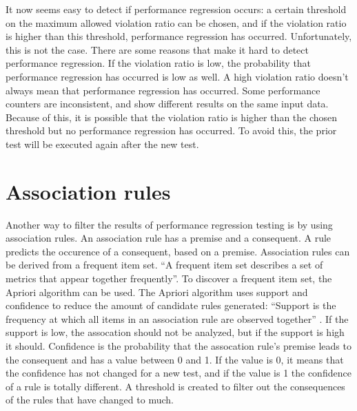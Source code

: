 It now seems easy to detect if performance regression occurs: a certain threshold on the maximum allowed violation ratio can be chosen, and if the violation ratio is higher than this threshold, performance regression has occurred. Unfortunately, this is not the case. There are some reasons that make it hard to detect performance regression. If the violation ratio is low, the probability that performance regression has occurred is low as well. A high violation ratio doesn't always mean that performance regression has occurred. Some performance counters are inconsistent, and show different results on the same input data. Because of this, it is possible that the violation ratio is higher than the chosen threshold but no performance regression has occurred. To avoid this, the prior test will be executed again after the new test.

\section{Association rules}
Another way to filter the results of performance regression testing is by using association rules. An association rule has a premise and a consequent. A rule predicts the occurence of a consequent, based on a premise. Association rules can be derived from a frequent item set. ``A frequent item set describes a set of metrics that appear together frequently''\cite{foo2010mining}. To discover a frequent item set, the Apriori algorithm can be used. The Apriori algorithm uses support and confidence to reduce the amount of candidate rules generated:
``Support is the frequency at which all items in an association rule are observed together'' \cite{foo2010mining}. If the support is low, the assocation should not be analyzed, but if the support is high it should. Confidence is the probability that the assocation rule's premise leads to the consequent and has a value between 0 and 1. If the value is 0, it means that the confidence has not changed for a new test, and if the value is 1 the confidence of a rule is totally different. A threshold is created to filter out the consequences of the rules that have changed to much.






